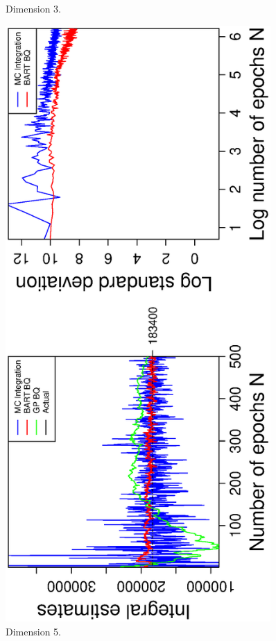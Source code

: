 \begin{figure}[H]
\begin{minipage}[b]{0.4\textwidth}
     \vspace{-1cm}
     \caption{Dimension 3.}
  \end{minipage}
    \hspace{1.5cm}
  \begin{minipage}[b]{0.4\textwidth}
    \includegraphics[width= 0.9\textwidth, angle = -90]{report/Figures/6/convergenceMean65Dimensions.eps}
    \vspace{-1cm}
    \caption{Dimension 5.}
  \end{minipage}
\end{figure}
\vspace{-1cm}

